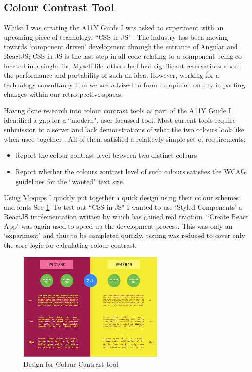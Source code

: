 \subsection{Colour Contrast Tool}
\label{sec:colour_contrast}
Whilst I was creating the A11Y Guide I was asked to experiment with an
upcoming piece of technology. ``CSS in JS" \citep{CSSInJS}. The industry has been moving
towards `component driven' development \citep{CDD} through the entrance of
Angular
and ReactJS; CSS in JS is the last step in all code relating to a
component being co-located in a single file. Myself like others had had
significant reservations \citep{AgainstCssInJs} about the performance and portability of
such an idea. However, working for a technology consultancy firm we are
advised to form an opinion on any impacting changes within our retrospective
spaces.

Having done research into colour contrast tools as part of the A11Y Guide I
identified a gap for a ``modern", user focussed tool. Most current tools
require submission to a server and lack demonstrations
of what the two colours look like when used together \cite*{JuicyStudio}. All
of them satisfied a relatievly simple set of requirements:
\begin{itemize}
\item Report the colour contrast level between two distinct colours
\item Report whether the colours contrast level of such colours satisfies the
 WCAG guidelines for the ``wanted" text size.
\end{itemize}

Using Moqups \citep{Moqups} I quickly put together a quick design using
their colour schemes and fonts See \ref{fig:colour_contrast_1}. To test out
``CSS in JS" I wanted to use `Styled Components' a ReactJS implementation
written by \cite*{StyledComponents} which has gained real traction. ``Create
React App" was again used to speed up the development process. This was
only an `experiment' and thus to be completed quickly, testing was reduced to
cover only the core logic for calculating colour contrast.

\begin{figure}[H]
\centering
\includegraphics[width=0.65\textwidth]{figures/colour_contrast_1}
\captionsetup{justification=centering}
\caption{Design for Colour Contrast tool
\label{fig:colour_contrast_1}}
\end{figure}

